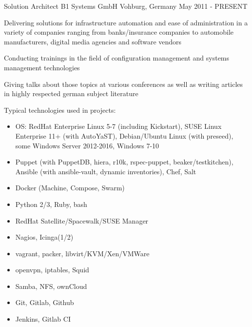 \begin{cventries}

  \cventry
    {Solution Architect} %
    {B1 Systems GmbH} %
    {Vohburg, Germany} %
    {May 2011 - PRESENT} %
    {
      \begin{cvitems} %
        \item Delivering solutions for infrastructure automation and ease of administration in a variety of companies ranging from banks/insurance companies to automobile manufacturers, digital media agencies and software vendors
        \item Conducting trainings in the field of configuration management and systems management technologies
        \item Giving talks about those topics at various conferences as well as writing articles in highly respected german subject literature
        \item Typical technologies used in projects:
          \begin{itemize}
            \item OS: RedHat Enterprise Linux 5-7 (including Kickstart), SUSE Linux Enterprise 11+ (with AutoYaST), Debian/Ubuntu Linux (with preseed), some Windows Server 2012-2016, Windows 7-10
            \item Puppet (with PuppetDB, hiera, r10k, rspec-puppet, beaker/testkitchen), Ansible (with ansible-vault, dynamic inventories), Chef, Salt
            \item Docker (Machine, Compose, Swarm)
            \item Python 2/3, Ruby, bash
            \item RedHat Satellite/Spacewalk/SUSE Manager
            \item Nagios, Icinga(1/2)
            \item vagrant, packer, libvirt/KVM/Xen/VMWare
            \item openvpn, iptables, Squid
            \item Samba, NFS, ownCloud
            \item Git, Gitlab, Github
            \item Jenkins, Gitlab CI
          \end{itemize}
      \end{cvitems}
    }


\end{cventries}
